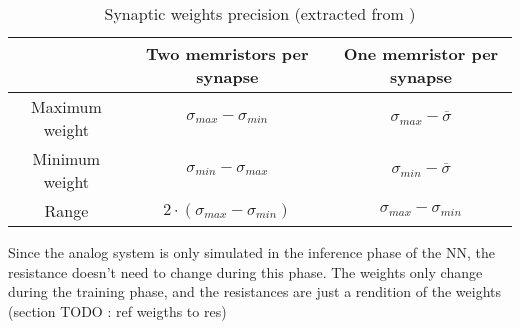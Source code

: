\begin{table}[H]
  \centering
  \begin{tabular}{|c|c|c|}
    \cline{2-3}
    \rowcolor{gray}
    \multicolumn{1}{c|}{\cellcolor[HTML]{FFFFFF}} & Two memristors per synapse & One memristor per synapse \\
    \hline
    Maximum weight & $\sigma_{max}-\sigma_{min}$ & $\sigma_{max} -\overline{\sigma}$\\
    \hline
    Minimum weight & $\sigma_{min}-\sigma_{max}$ & $\sigma_{min} -\overline{\sigma}$\\
    \hline
    Range & $2\cdot(\sigma_{max}-\sigma_{min})$&$\sigma_{max}-\sigma_{min}$\\
    \hline
  \end{tabular}
  \caption{Synaptic weights precision (extracted from \cite{doubleMem})}
  \label{tab:synapses}
\end{table}


Since the analog system is only simulated in the inference phase of the \ac{NN}, the resistance doesn't need to change during this phase. The weights only change during the training phase, and the resistances are just a rendition of the weights (section TODO : ref weigths to res)
